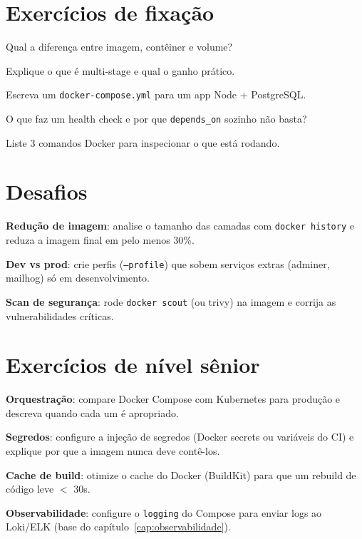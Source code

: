 \section{Exercícios de fixação}

\begin{exercicios}
  \item Qual a diferença entre imagem, contêiner e volume?
  \item Explique o que é multi-stage e qual o ganho prático.
  \item Escreva um \texttt{docker-compose.yml} para um app Node + PostgreSQL.
  \item O que faz um health check e por que \texttt{depends\_on} sozinho não basta?
  \item Liste 3 comandos Docker para inspecionar o que está rodando.
\end{exercicios}

\section{Desafios}

\begin{desafios}
  \item \textbf{Redução de imagem}: analise o tamanho das camadas com \texttt{docker history} e reduza a imagem final em pelo menos 30\%.
  \item \textbf{Dev vs prod}: crie perfis (\texttt{--profile}) que sobem serviços extras (adminer, mailhog) só em desenvolvimento.
  \item \textbf{Scan de segurança}: rode \texttt{docker scout} (ou trivy) na imagem e corrija as vulnerabilidades críticas.
\end{desafios}

\section{Exercícios de nível sênior}

\begin{seniores}
  \item \textbf{Orquestração}: compare Docker Compose com Kubernetes para produção e descreva quando cada um é apropriado.
  \item \textbf{Segredos}: configure a injeção de segredos (Docker secrets ou variáveis do CI) e explique por que a imagem nunca deve contê-los.
  \item \textbf{Cache de build}: otimize o cache do Docker (BuildKit) para que um rebuild de código leve $<$ 30s.
  \item \textbf{Observabilidade}: configure o \texttt{logging} do Compose para enviar logs ao Loki/ELK (base do capítulo~\ref{cap:observabilidade}).
\end{seniores}

